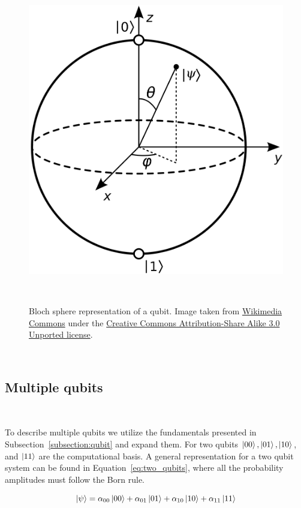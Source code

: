 \begin{figure}[ht]
  \includegraphics[scale=0.1]{figures/Bloch_sphere.png}
  \centering
  \caption{Bloch sphere representation of a qubit. Image taken from \href{https://commons.wikimedia.org/wiki/File:Bloch_Sphere.svg}{Wikimedia Commons} under the \href{https://en.wikipedia.org/wiki/Creative_Commons}{Creative Commons Attribution-Share Alike 3.0 Unported license}.}
~\label{fig:bloch_sphere}
\end{figure} \

\subsection{Multiple qubits} \

To describe multiple qubits we utilize the fundamentals presented in
Subsection~\ref{subsection:qubit} and expand them. For two qubits
\(\ket{00}, \ket{01}, \ket{10}\), and \(\ket{11}\) are the computational basis.
A general representation for a two qubit system can be found in 
Equation~\ref{eq:two_qubits}, where all the probability amplitudes must
follow the Born rule. \ 

\begin{equation}\label{eq:two_qubits}
  \ket{\psi} = \alpha_{00}\ket{00} + \alpha_{01}\ket{01} + \alpha_{10}\ket{10} + \alpha_{11}\ket{11}
\end{equation} \

